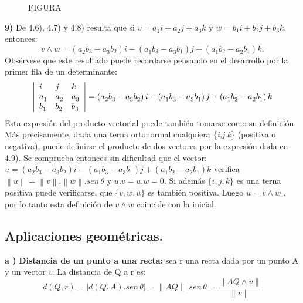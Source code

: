 \begin{figure}[htb]
\centering
FIGURA
\end{figure}

\textbf{9) }De 4.6), 4.7) y 4.8) resulta que si $v = a_{1}^{} i +
a_{2}^{} j + a_{3}^{} k$ y $w = b_{1}^{} i + b_{2}^{} j + b_{3}^{}
k$.
 entonces:
\[
v \wedge w = \left( {a_{2}^{} b_{3}^{}  - a_{3}^{} b_{2}^{} }
\right)i - \left( {a_{1}^{} b_{3}^{}  - a_{3}^{} b_{1}^{} }
\right)j + \left( {a_{1}^{} b_{2}^{}  - a_{2}^{} b_{1}^{} }
\right)k.
\]
Obs\'{e}rvese que este resultado puede recordarse pensando en el
desarrollo por la primer fila de un determinante:
\[
\left| {{\begin{array}{*{20}c}
  {i} \hfill & {j} \hfill & {k} \hfill  \\
  {a_{1}^{} } \hfill & {a_{2}^{} } \hfill & {a_{3}^{} } \hfill  \\
  {b_{1}^{} } \hfill & {b_{2}^{} } \hfill & {b_{3}^{} } \hfill  \\
\end{array} }} \right| = \left( {a_{2}^{} b_{3}^{}  - a_{3}^{} b_{2}^{} }
\right)i - \left( {a_{1}^{} b_{3}^{}  - a_{3}^{} b_{1}^{} }
\right)j + \left( {a_{1}^{} b_{2}^{}  - a_{2}^{} b_{1}^{} }
\right)k
\]
Esta expresi\'{o}n del producto vectorial puede tambi\'{e}n
tomarse como su definici\'{o}n. M\'{a}s precisamente, dada una
terna ortonormal cualquiera \{\textit{i,j,k}\} (positiva o
negativa), puede definirse el producto de dos vectores por la
expresi\'{o}n dada en 4.9). Se comprueba entonces sin dificultad
que el vector:
 $u = \left( {a_{2}^{} b_{3}^{}  - a_{3}^{} b_{2}^{} } \right)i - \left(
{a_{1}^{} b_{3}^{}  - a_{3}^{} b_{1}^{} } \right)j + \left(
{a_{1}^{} b_{2}^{}  - a_{2}^{} b_{1}^{} } \right)k$ verifica
$\left\| {u} \right\| = \left\| {v} \right\|.\left\| {w}
\right\|.sen\,\theta $ y $u.v = u.w = 0$. Si adem\'{a}s $
\{i,j,k\}$ es una terna positiva puede verificarse, que $
\{v,w,u\}$ es tambi\'{e}n positiva. Luego $u = v \wedge w$ , por
lo tanto esta definici\'{o}n de $v \wedge w$ coincide con la
inicial.
\bigskip

\subsection{Aplicaciones geom\'{e}tricas.}

\textbf{a ) }\textbf {Distancia de un punto a una recta:} sea r
una recta dada por un punto A y un vector \textit{v}. La distancia
de Q a r es:
\[
d\left( {Q,r} \right) = \left| {d\left( {Q,A} \right).sen\,\theta
} \right| = \left\| {AQ} \right\|.sen\,\theta  = \frac{{\left\|
{AQ \wedge v} \right\|}}{{\left\| {v} \right\|}}
\]


